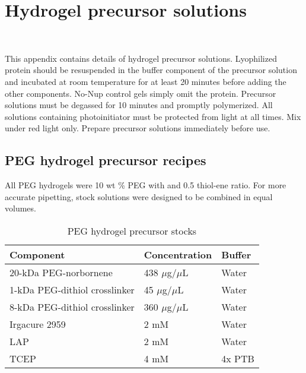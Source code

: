 \chapter{Hydrogel precursor solutions}~\label{appx:precursor-recipes}

This appendix contains details of hydrogel precursor solutions. Lyophilized protein should be resuspended in the buffer component of the precursor solution and incubated at room temperature for at least 20 minutes before adding the other components.  No-Nup control gels simply omit the protein.  Precursor solutions must be degassed for 10 minutes and promptly polymerized.  All solutions containing photoinitiator must be protected from light at all times.  Mix under red light only.  Prepare precursor solutions immediately before use.

\section{PEG hydrogel precursor recipes}

All PEG hydrogels were 10 wt \% PEG with and 0.5 thiol-ene ratio.  For more accurate pipetting, stock solutions were designed to be combined in equal volumes. 

\begin{table}[b!]
\centering
  \caption{PEG hydrogel precursor stocks}
    \label{table:Irgacure}
    \begin{tabular}{p{5cm}p{4cm}p{5cm}}
      Component & Concentration & Buffer \\
\hline
20-kDa PEG-norbornene & 438 $\mu$g/$\mu$L & Water \\
1-kDa PEG-dithiol crosslinker & 45 $\mu$g/$\mu$L & Water \\
8-kDa PEG-dithiol crosslinker & 360 $\mu$g/$\mu$L & Water \\
Irgacure 2959 & 2 mM & Water \\
LAP & 2 mM & Water \\
TCEP & 4 mM & 4x PTB \\
\hline
    \end{tabular}
\end{table}

